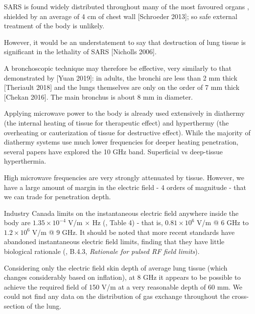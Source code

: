 \documentclass[paper.tex]{subfiles}
\begin{document}
SARS is found widely distributed throughout many of the most favoured organs \cite{Organ2004}, shielded by an average of 4 cm of chest wall [Schroeder 2013]; so safe external treatment of the body is unlikely.

\cite{neuroinvasive2020} \cite{situ2020}

However, it would be an understatement to say that destruction of lung tissue is significant in the lethality of SARS [Nicholls 2006]. 

A bronchoscopic technique may therefore be effective, very similarly to that demonstrated by [Yuan 2019]: in adults, the bronchi are less than 2 mm thick [Theriault 2018] and the lungs themselves are only on the order of 7 mm thick [Chekan 2016]. The main bronchus is about 8 mm in diameter.




Applying microwave power to the body is already used extensively in diathermy (the internal heating of tissue for therapeutic effect) and hyperthermy (the overheating or cauterization of tissue for destructive effect). While the majority of diathermy systems use much lower frequencies for deeper heating penetration, several papers have explored the 10 GHz band. Superficial vs deep-tissue hyperthermia.

High microwave frequencies are very strongly attenuated by tissue. However, we have a large amount of margin in the electric field - 4 orders of magnitude - that we can trade for penetration depth.

Industry Canada limits on the instantaneous electric field anywhere inside the body are $1.35 \times 10^{-4}$ V/m $\times$ Hz (\cite{RSS1022015}, Table 4) - that is, $0.81 \times 10^6$ V/m @ 6 GHz to $1.2 \times 10^6$ V/m @ 9 GHz. It should be noted that more recent standards have abandoned instantaneous electric field limits, finding that they have little biological rationale (\cite{C95}, B.4.3, {\it Rationale for pulsed RF field limits}).\footnotemark






Considering only the electric field skin depth\footnotemark\cite{Safety2001}\cite{Physical1982} of average lung tissue\cite{gabriel1996compilation}\cite{Dielectricb}\cite{Dielectric}\cite{Tissue2018} (which changes considerably based on inflation), at 8 GHz it appears to be possible to achieve the required field of 150 V/m at a very reasonable depth of 60 mm. We could not find any data on the distribution of gas exchange throughout the cross-section of the lung.
\end{document}
